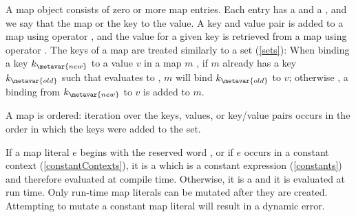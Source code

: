 \documentclass[makeidx]{article}
\begin{document}
{\LMHash{}%
A map object consists of zero or more map entries.
Each entry has a  and a ,
and we say that the map
 or
the key to the value.
A key and value pair is
added to a map using operator \lit{[]=},
and the value for a given key is retrieved from a map using operator \lit{[]}.
The keys of a map are treated similarly to a set
(\ref{sets}):
When binding a key $k_{\metavar{new}}$ to a value $v$ in a map $m$
,
if $m$ already has a key $k_{\metavar{old}}$ such that
 evaluates to \TRUE,
$m$ will bind $k_{\metavar{old}}$ to $v$;
otherwise
,
a binding from $k_{\metavar{new}}$ to $v$ is added to $m$.

\LMHash{}%
A map is ordered: iteration over the keys, values, or key/value pairs
occurs in the order in which the keys were added to the set.


\LMHash{}%
If a map literal $e$ begins with the reserved word \CONST,
or if $e$ occurs in a constant context
(\ref{constantContexts}),
it is a
which is a constant expression
(\ref{constants})
and therefore evaluated at compile time.
Otherwise, it is a
and it is evaluated at run time.
Only run-time map literals can be mutated after they are created.
Attempting to mutate a constant map literal will result in a dynamic error.


}
\end{document}
